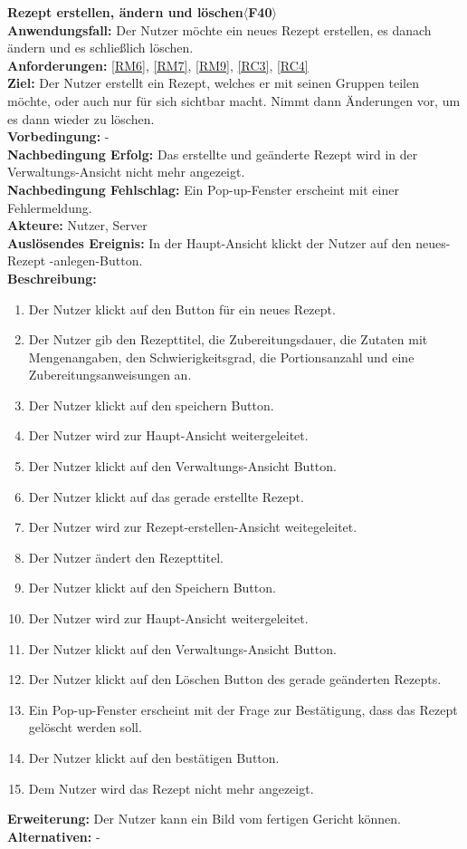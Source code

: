 \documentclass[parskip=full]{scrartcl}
\begin{document}
\textbf{Rezept erstellen, ändern und löschen$\langle$F40$\rangle$}\\
\textbf{Anwendungsfall:} Der Nutzer möchte ein neues Rezept erstellen, es danach ändern und es schließlich löschen.\\
\textbf{Anforderungen:} \ref{RM6}, \ref{RM7}, \ref{RM9}, \ref{RC3}, \ref{RC4}\\
\textbf{Ziel:} Der Nutzer erstellt ein Rezept, welches er mit seinen Gruppen teilen möchte, oder auch nur für sich sichtbar macht. Nimmt dann Änderungen vor, um es dann wieder zu löschen.\\
\textbf{Vorbedingung:} -\\
\textbf{Nachbedingung Erfolg:} Das erstellte und geänderte Rezept wird in der Verwaltungs-Ansicht nicht mehr angezeigt.  \\
\textbf{Nachbedingung Fehlschlag:} Ein Pop-up-Fenster erscheint mit einer Fehlermeldung.\\
\textbf{Akteure:} Nutzer, Server\\
\textbf{Auslösendes Ereignis:} In der Haupt-Ansicht klickt der Nutzer auf den neues-Rezept -anlegen-Button.\\
\textbf{Beschreibung:}
\begin{enumerate}
    \item Der Nutzer klickt auf den Button für ein neues Rezept.
    \item Der Nutzer gib den Rezepttitel, die Zubereitungsdauer, die Zutaten mit Mengenangaben, den Schwierigkeitsgrad, die Portionsanzahl und eine Zubereitungsanweisungen an.
    \item Der Nutzer klickt auf den speichern Button.
    \item Der Nutzer wird zur Haupt-Ansicht weitergeleitet.
    \item Der Nutzer klickt auf den Verwaltungs-Ansicht Button.
    \item Der Nutzer klickt auf das gerade erstellte Rezept.
    \item Der Nutzer wird zur Rezept-erstellen-Ansicht weitegeleitet.
    \item Der Nutzer ändert den Rezepttitel.
    \item Der Nutzer klickt auf den Speichern Button.
    \item Der Nutzer wird zur Haupt-Ansicht weitergeleitet. 
    \item Der Nutzer klickt auf den Verwaltungs-Ansicht Button.
    \item Der Nutzer klickt auf den Löschen Button des gerade geänderten Rezepts.
    \item Ein Pop-up-Fenster erscheint mit der Frage zur Bestätigung, dass das Rezept gelöscht werden soll.
    \item Der Nutzer klickt auf den bestätigen Button.
    \item Dem Nutzer wird das Rezept nicht mehr angezeigt.
\end{enumerate}
\textbf{Erweiterung:} Der Nutzer kann ein Bild vom fertigen Gericht können.\\
\textbf{Alternativen:} -\\
\newpage
\end{document}
